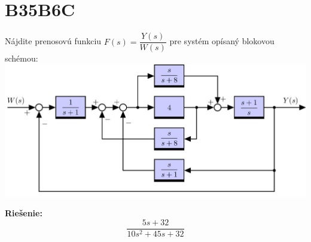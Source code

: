 \documentclass[a4paper, 12pt]{article}
\newenvironment{task}{}{}
\newenvironment{solution}{\noindent\textbf{Riešenie:}}{}
\begin{document}
\section*{B35B6C}
\begin{task}
    Nájdite prenosovú funkciu $F(s)=\dfrac{Y(s)}{W(s)}$ pre systém opísaný blokovou schémou: \\

    \includegraphics{images/blokovka02_00004.jpg}
\end{task}

\begin{solution}
    \begin{equation*}
        \dfrac{5s+32}{10s^2+45s+32}
    \end{equation*}
\end{solution}
\end{document}
